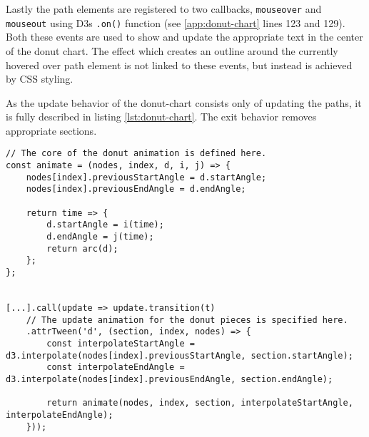 Lastly the path elements are registered to two callbacks, \texttt{mouseover} and \texttt{mouseout} using D3s \texttt{.on()} function (see \ref{app:donut-chart} lines 123 and 129). Both these events are used to show and update the appropriate text in the center of the donut chart. The effect which creates an outline around the currently hovered over path element is not linked to these events, but instead is achieved by CSS styling.

As the update behavior of the donut-chart consists only of updating the paths, it is fully described in listing \ref{lst:donut-chart}. The exit behavior removes appropriate sections.

\begin{minipage}{0.9\linewidth}
    \begin{lstlisting}[style=htmlCSSjs, captionpos=b, caption={The implementation of the arc update animations. As the core of the animation donut sections is used by the enter and the update behavior, it is defined first. The new values for start and end angle are stored on the node itself. This needs to be done to be able to reference these values again for the next update, as the previous angles will not be accessible through the pie object after regenerating it for an update. Finally the function which is called for each frame of the animation is defined and returned. This function first interpolates the start and end angle values using the passed interpolation functions and the time value. This time value is in the range of zero to one, depending on how far along the animation is. These newly interpolated angles define the start and end angle of the pie piece, which is then turned into a path element by calling the \texttt{arc} function for this pie piece. As the interpolate functions \texttt{interpolateStartAngle} and \texttt{interpolateEndAngle} differ for the enter and update behavior, they are defined in the respective sections. They are passed into the core \texttt{animate} function. (Section from \ref{app:donut-chart} lines 136ff)}, label={lst:donut-chart}]
// The core of the donut animation is defined here.
const animate = (nodes, index, d, i, j) => {
    nodes[index].previousStartAngle = d.startAngle;
    nodes[index].previousEndAngle = d.endAngle;
    
    return time => {
        d.startAngle = i(time);
        d.endAngle = j(time);
        return arc(d);
    };
};


[...].call(update => update.transition(t)
    // The update animation for the donut pieces is specified here.
    .attrTween('d', (section, index, nodes) => {
        const interpolateStartAngle = d3.interpolate(nodes[index].previousStartAngle, section.startAngle);
        const interpolateEndAngle = d3.interpolate(nodes[index].previousEndAngle, section.endAngle);

        return animate(nodes, index, section, interpolateStartAngle, interpolateEndAngle);
    }));
    \end{lstlisting}
\end{minipage}


